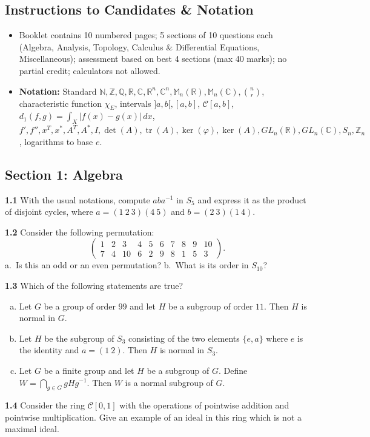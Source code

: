 \documentclass[11pt,a4paper]{article}
\newcommand{\N}{\mathbb{N}}
\newcommand{\Z}{\mathbb{Z}}
\newcommand{\Q}{\mathbb{Q}}
\newcommand{\R}{\mathbb{R}}
\newcommand{\C}{\mathbb{C}}
\newcommand{\M}{\mathbb{M}}
\newcommand{\tr}{\operatorname{tr}}
\newcommand{\examsec}[1]{%
  \subsection*{#1}
  \vspace{-2pt}
}
\newcommand{\qitem}[1]{\par\medskip\noindent\textbf{#1}\hspace{0.5em}}
\begin{document}
\subsection*{Instructions to Candidates \& Notation}
\begin{itemize}
  \item Booklet contains 10 numbered pages; 5 sections of 10 questions each (Algebra, Analysis, Topology, Calculus \& Differential Equations, Miscellaneous); assessment based on best 4 sections (max 40 marks); no partial credit; calculators not allowed.
  \item \textbf{Notation:} Standard $\N, \Z, \Q, \R, \C, \R^n, \C^n, \M_n(\R), \M_n(\C), \binom{n}{r}$, characteristic function $\chi_E$, intervals $]a, b[, [a, b]$, $\mathcal{C}[a, b]$, $d_1(f, g) = \int_X |f(x) - g(x)|\,dx$, $f', f'', x^T, x^*, A^T, A^*, I, \det(A), \tr(A), \ker(\varphi), \ker(A), GL_n(\R), GL_n(\C), S_n, \Z_n$, logarithms to base $e$.
\end{itemize}

\examsec{Section 1: Algebra}

\qitem{1.1} With the usual notations, compute $aba^{-1}$ in $S_5$ and express it as the product of disjoint cycles, where $a = (1\ 2\ 3)(4\ 5)$ and $b = (2\ 3)(1\ 4)$.

\qitem{1.2} Consider the following permutation:
\[
  \begin{pmatrix} 1 & 2 & 3 & 4 & 5 & 6 & 7 & 8 & 9 & 10 \\ 7 & 4 & 10 & 6 & 2 & 9 & 8 & 1 & 5 & 3 \end{pmatrix}.
\]
a.\ Is this an odd or an even permutation? \qquad b.\ What is its order in $S_{10}$?

\qitem{1.3} Which of the following statements are true?
\begin{enumerate}[a.]
  \item Let $G$ be a group of order $99$ and let $H$ be a subgroup of order $11$. Then $H$ is normal in $G$.
  \item Let $H$ be the subgroup of $S_3$ consisting of the two elements $\{e, a\}$ where $e$ is the identity and $a = (1\ 2)$. Then $H$ is normal in $S_3$.
  \item Let $G$ be a finite group and let $H$ be a subgroup of $G$. Define $W = \bigcap_{g \in G} gHg^{-1}$. Then $W$ is a normal subgroup of $G$.
\end{enumerate}

\qitem{1.4} Consider the ring $\mathcal{C}[0, 1]$ with the operations of pointwise addition and pointwise multiplication. Give an example of an ideal in this ring which is not a maximal ideal.
\end{document}
